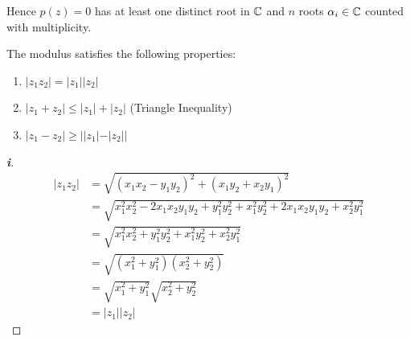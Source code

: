 \documentclass[../main.tex]{subfiles}
\begin{document}
Hence $p(z) = 0$ has at least one distinct root in $\mathbb{C}$ and $n$ roots $\alpha_i \in \mathbb{C}$ counted with multiplicity.
\begin{proposition}
  The modulus satisfies the following properties: \label{modulusProperties}
  \begin{enumerate}
    \item $|z_1 z_2| = |z_1||z_2|$
    \item $|z_1 + z_2| \leq |z_1| + |z_2|$ (Triangle Inequality)
    \item $|z_1 - z_2| \geq ||z_1| - |z_2||$
  \end{enumerate}
\end{proposition}
\begin{proof}[\textbf{i}]
  \begin{align*}
      |z_1 z_2| &= \sqrt{(x_1 x_2 - y_1 y_2)^2 + (x_1 y_2 + x_2 y_1)^2}\\
                &= \sqrt{x^{2}_{1} x^{2}_{2} -2x_1x_2y_1y_2 + y^{2}_{1}y^{2}_{2} + x^{2}_{1}y^{2}_{2} + 2x_1x_2y_1y_2 + x^{2}_{2}y^{2}_{1}} \\
                &= \sqrt{x^{2}_{1} x^{2}_{2} + y^{2}_{1} y^{2}_{2} + x^{2}_{1} y^{2}_{2} + x^{2}_{2} y^{2}_{1}} \\
                &= \sqrt{\left(x^{2}_{1} + y^{2}_{1}\right)\left(x^{2}_{2} + y^{2}_{2}\right)} \\
                &= \sqrt{x^{2}_{1} + y^{2}_{1}}\sqrt{x^{2}_{2} + y^{2}_{2}} \\
                &= |z_1||z_2|
  \end{align*}
\end{proof}
\end{document}
